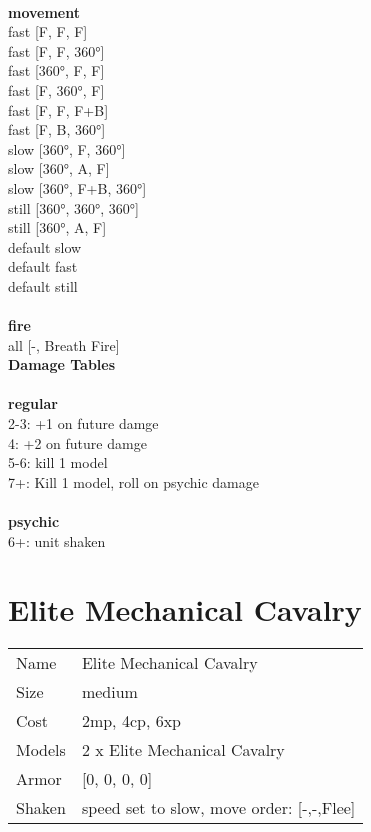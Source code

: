 \ \\ {\bf movement } \\
fast [F, F, F] \\
fast [F, F, 360°] \\
fast [360°, F, F] \\
fast [F, 360°, F] \\
fast [F, F, F+B] \\
fast [F, B, 360°] \\
slow [360°, F, 360°] \\
slow [360°, A, F] \\
slow [360°, F+B, 360°] \\
still [360°, 360°, 360°] \\
still [360°, A, F] \\
default slow \\
default fast \\
default still \\
\ \\ {\bf fire } \\
all [-, Breath Fire] \\


{\bf Damage Tables} \\
\ \\ {\bf regular } \\
2-3: +1 on future damge \\
4: +2 on future damge \\
5-6: kill 1 model \\
7+: Kill 1 model, roll on psychic damage \\
\ \\ {\bf psychic } \\
6+: unit shaken \\










\pagebreak\pagebreak

\section{ Elite Mechanical Cavalry }

\begin{tabular}{ll}
  Name & Elite Mechanical Cavalry \\
  Size & medium\\
  Cost & 2mp, 4cp, 6xp\\
  Models & 2 x Elite Mechanical Cavalry\\
  Armor & [0, 0, 0, 0]\\
  Shaken & speed set to slow, move order: [-,-,Flee]\\
\end{tabular}

